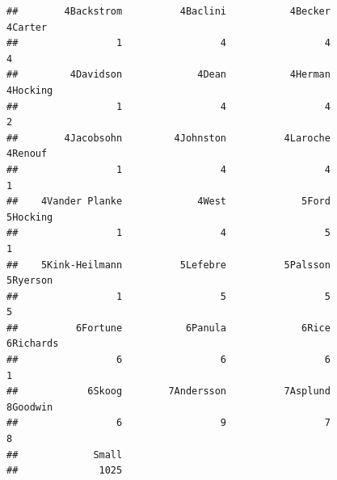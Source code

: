 \documentclass[ignorenonframetext,]{beamer}
\begin{document}
\begin{frame}[fragile]{}
\begin{verbatim}
##        4Backstrom          4Baclini           4Becker           4Carter 
##                 1                 4                 4                 4 
##         4Davidson             4Dean           4Herman          4Hocking 
##                 1                 4                 4                 2 
##        4Jacobsohn         4Johnston          4Laroche           4Renouf 
##                 1                 4                 4                 1 
##    4Vander Planke             4West             5Ford          5Hocking 
##                 1                 4                 5                 1 
##    5Kink-Heilmann          5Lefebre          5Palsson          5Ryerson 
##                 1                 5                 5                 5 
##          6Fortune           6Panula             6Rice         6Richards 
##                 6                 6                 6                 1 
##            6Skoog        7Andersson          7Asplund          8Goodwin 
##                 6                 9                 7                 8 
##             Small 
##              1025
\end{verbatim}

\end{frame}
\end{document}
